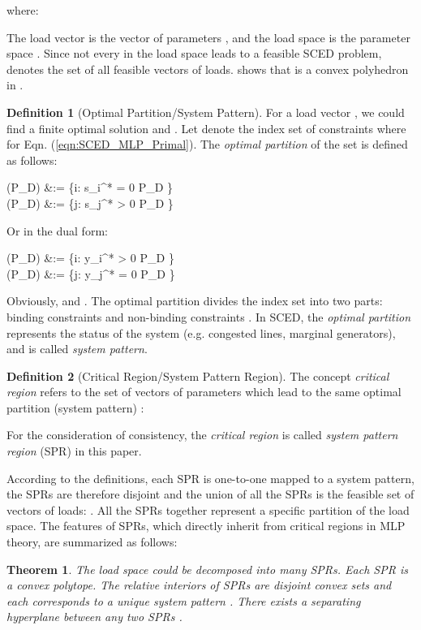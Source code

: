 \documentclass[letterpaper, 11pt]{article}
\theoremstyle{plain}
\newtheorem{thm}{Theorem}
\theoremstyle{definition}
\newtheorem{defn}{Definition}
\begin{document}
where:

The load vector  is the vector of parameters , and the load space  is the parameter space . Since not every  in the load space leads to a feasible SCED problem,   denotes the set of all feasible vectors of loads. \cite{Gal1972} shows that  is a convex polyhedron in .

\begin{defn}[Optimal Partition/System Pattern]
\label{defn:optimal_partition}
For a load vector , we could find a finite optimal solution  and . Let  denote the index set of constraints where  for Eqn. (\ref{eqn:SCED_MLP_Primal}). The \emph{optimal partition}  of the set  is defined as follows:

  (P_D) &:= \{i: s_i^* = 0  P_D \in {}  \} \\
  (P_D) &:= \{j: s_j^* > 0  P_D \in {} \} 

Or in the dual form:

  (P_D) &:= \{i: y_i^* > 0  P_D \in {}  \} \\
  (P_D) &:= \{j: y_j^* = 0  P_D \in {} \} 

Obviously,  and . The optimal partition  divides the index set into two parts: binding constraints  and non-binding constraints .
In SCED, the \emph{optimal partition} represents the status of the system (e.g. congested lines, marginal generators), and is called \emph{system pattern}.
\end{defn}

\begin{defn}[Critical Region/System Pattern Region]
The concept \emph{critical region} refers to the set of vectors of parameters which lead to the same optimal partition (system pattern) :

For the consideration of consistency, the \emph{critical region} is called \emph{system pattern region} (SPR) in this paper.
\end{defn}
According to the definitions, each SPR is one-to-one mapped to a system pattern, the SPRs are therefore disjoint and the union of all the SPRs is the feasible set of vectors of loads: .
All the SPRs together represent a specific partition of the load space. The features of SPRs, which directly inherit from critical regions in MLP theory, are summarized as follows:
\begin{thm}
\label{thm:convexSPR}
The load space could be decomposed into many SPRs. Each SPR is a convex polytope. The relative interiors of SPRs are disjoint convex sets and each corresponds to a unique system pattern \cite{Zhou2011}. 
There exists a separating hyperplane between any two SPRs \cite{Geng2015}.
\end{thm}
\end{document}
